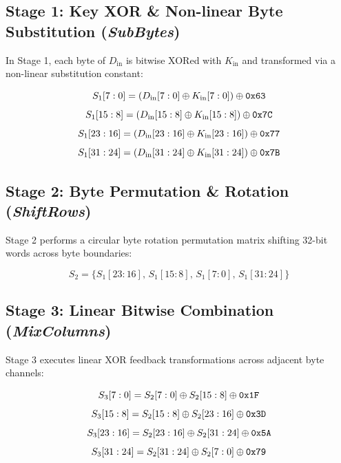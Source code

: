 \documentclass[11pt,a4paper,oneside]{book}
\begin{document}
\subsection{Stage 1: Key XOR \& Non-linear Byte Substitution (\textit{SubBytes})}
In Stage 1, each byte of $D_{\text{in}}$ is bitwise XORed with $K_{\text{in}}$ and transformed via a non-linear substitution constant:

\begin{equation}
S_1[7:0] = (D_{\text{in}}[7:0] \oplus K_{\text{in}}[7:0]) \oplus \text{\texttt{0x63}}
\end{equation}
\begin{equation}
S_1[15:8] = (D_{\text{in}}[15:8] \oplus K_{\text{in}}[15:8]) \oplus \text{\texttt{0x7C}}
\end{equation}
\begin{equation}
S_1[23:16] = (D_{\text{in}}[23:16] \oplus K_{\text{in}}[23:16]) \oplus \text{\texttt{0x77}}
\end{equation}
\begin{equation}
S_1[31:24] = (D_{\text{in}}[31:24] \oplus K_{\text{in}}[31:24]) \oplus \text{\texttt{0x7B}}
\end{equation}

\subsection{Stage 2: Byte Permutation \& Rotation (\textit{ShiftRows})}
Stage 2 performs a circular byte rotation permutation matrix shifting 32-bit words across byte boundaries:

\begin{equation}
S_2 = \{S_1[23:16],\, S_1[15:8],\, S_1[7:0],\, S_1[31:24]\}
\end{equation}

\subsection{Stage 3: Linear Bitwise Combination (\textit{MixColumns})}
Stage 3 executes linear XOR feedback transformations across adjacent byte channels:

\begin{equation}
S_3[7:0] = S_2[7:0] \oplus S_2[15:8] \oplus \text{\texttt{0x1F}}
\end{equation}
\begin{equation}
S_3[15:8] = S_2[15:8] \oplus S_2[23:16] \oplus \text{\texttt{0x3D}}
\end{equation}
\begin{equation}
S_3[23:16] = S_2[23:16] \oplus S_2[31:24] \oplus \text{\texttt{0x5A}}
\end{equation}
\begin{equation}
S_3[31:24] = S_2[31:24] \oplus S_2[7:0] \oplus \text{\texttt{0x79}}
\end{equation}
\end{document}
